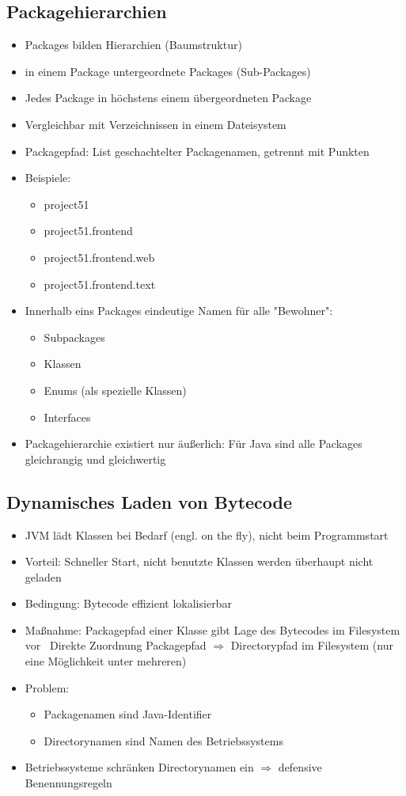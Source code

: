 \subsection{Packagehierarchien}
\begin{itemize}
\item Packages bilden Hierarchien (Baumstruktur)
\item in einem Package untergeordnete Packages (Sub-Packages)
\item Jedes Package in höchstens einem übergeordneten Package
\item Vergleichbar mit Verzeichnissen in einem Dateisystem
\item Packagepfad: List geschachtelter Packagenamen, getrennt mit Punkten
\item Beispiele:
\begin{itemize}
	\item project51
	\item project51.frontend
	\item project51.frontend.web
	\item project51.frontend.text
\end{itemize}
\item Innerhalb eins Packages eindeutige Namen für alle "Bewohner":
	\begin{itemize}
	\item Subpackages
	\item Klassen
	\item Enums (als spezielle Klassen)
	\item Interfaces
	\end{itemize}
\item Packagehierarchie existiert nur äußerlich: Für Java sind alle Packages gleichrangig und gleichwertig
\end{itemize}

\subsection{Dynamisches Laden von Bytecode}
\begin{itemize}
\item JVM lädt Klassen bei Bedarf (engl. on the fly), nicht beim Programmstart
\item Vorteil: Schneller Start, nicht benutzte Klassen werden überhaupt nicht geladen
\item Bedingung: Bytecode effizient lokalisierbar
\item Maßnahme: Packagepfad einer Klasse gibt Lage des Bytecodes im Filesystem vor
\ Direkte Zuordnung Packagepfad $\Rightarrow$ Directorypfad im Filesystem (nur eine Möglichkeit unter mehreren)
\item Problem:
	\begin{itemize}
	\item Packagenamen sind Java-Identifier
	\item Directorynamen sind Namen des Betriebssystems
	\end{itemize}
\item Betriebssysteme schränken Directorynamen ein $\Rightarrow$ defensive Benennungsregeln
\end{itemize}

